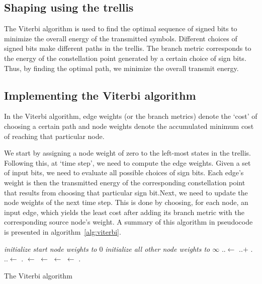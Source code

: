 \subsection{Shaping using the trellis}

The Viterbi algorithm is used to find the optimal sequence of signed bits to
minimize the overall energy of the transmitted symbols. Different choices of
signed bits make different paths in the trellis. The branch metric corresponds
to the energy of the constellation point generated by a certain choice of sign
bits. Thus, by finding the optimal path, we minimize the overall transmit
energy.

\subsection{Implementing the Viterbi algorithm}

In the Viterbi algorithm, edge weights (or the branch metrics) denote the
`cost' of choosing a certain path and node weights denote the accumulated
minimum cost of reaching that particular node.

We start by assigning a node weight of zero to the left-most states in the
trellis. Following this, at `time step', we need to compute the edge weights.
Given a set of input bits, we need to evaluate all possible choices of sign
bits. Each edge's weight is then the transmitted energy of the corresponding
constellation point that results from choosing that particular sign bit.Next,
we need to update the node weights of the next time step. This is done by
choosing, for each node, an input edge, which yields the least cost after
adding its branch metric with the corresponding source node's weight. A summary
of this algorithm in pseudocode is presented in algorithm~\ref{alg:viterbi}.

\begin{algorithm}[h]
	    
	   
	 
	 

	\Output{\Path}
	\BlankLine
	\emph{initialize start node weights to $0$}\;
	\emph{initialize all other node weights to $\infty$}\;
	 {
		 {
			\;
			 {
				\Edge.\ToNode.\Weight $\leftarrow$ \Edge.\FromNode.\Weight $+$ \Edge.\Weight\;
				\Edge.\ToNode.\PrevNode $\leftarrow$ \Edge.\FromNode\;
			}
		}
	}
	\MinNode $\leftarrow$ \;
	\Node $\leftarrow$ \MinNode\;
	 {
		\Path $\leftarrow$ \Node\;
		\Node $\leftarrow$ \Node.\PrevNode\;
	}
	\Return \Path\;
	\caption{The Viterbi algorithm}
	\label{alg:viterbi}
\end{algorithm}
